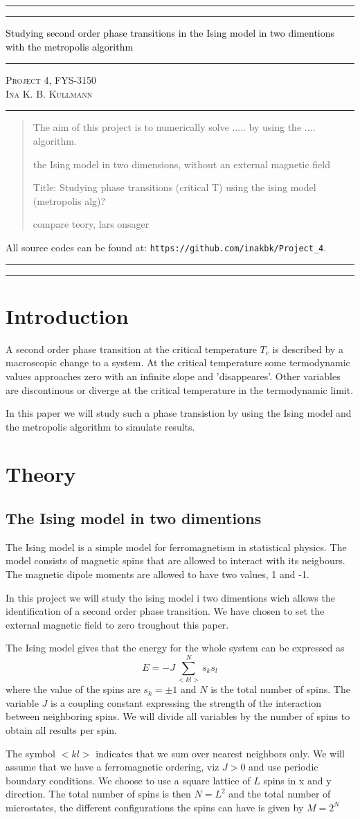 \documentclass[11pt,a4wide]{article}
\newcommand*{\titleAT}{\begingroup %
\newlength{\drop} %
\drop=0.1\textheight %

\rule{\textwidth}{1pt}\par %
\vspace{2pt}\vspace{-\baselineskip} %
\rule{\textwidth}{0.4pt}\par %

\vspace{0.5\drop} %
\centering %
\textcolor{black}{ %
{\Huge Studying second order phase transitions in the Ising model in two dimentions with the metropolis algorithm}\\[0.75\baselineskip] %
} 

\vspace{0.25\drop} %
\rule{0.3\textwidth}{0.4pt}\par %
\vspace{0.25\drop} %

{\Large \textsc{Project 4, FYS-3150\\[0.75\baselineskip] \normalsize{Ina K. B. Kullmann}
}}\par %


\vspace{0.25\drop} %
\rule{0.3\textwidth}{0.4pt}\par %
\vspace{0.25\drop} %

\begin{abstract}
The aim of this project is to numerically solve ..... by using the .... algorithm. 


the Ising model in two dimensions, without an external magnetic 
field

Title: Studying phase transitions (critical T) using the ising model (metropolis alg)?

compare teory, lars onsager





\end{abstract}
\vspace*{0.25\drop} %

\begin{center}
{ \scriptsize \noindent All source codes can be found at: \texttt{https://github.com/inakbk/Project\_4}. }
\end{center}

\rule{\textwidth}{0.4pt}\par %
\vspace{2pt}\vspace{-\baselineskip} %
\rule{\textwidth}{1pt}\par %

\endgroup}
\begin{document}
\titleAT %


\newpage
\tableofcontents
\newpage

\section{Introduction}
A second order phase transition at the critical temperature $T_c$ is described by a macroscopic change to a system. At the critical temperature some termodynamic values approaches zero with an infinite slope and 'disappeares'. Other variables are discontinous or diverge at the critical temperature in the termodynamic limit. 

In this paper we will study such a phase transistion by using the Ising model and the metropolis algorithm to simulate results. 

\section{Theory}

\subsection{The Ising model in two dimentions}
The Ising model is a simple model for ferromagnetism in statistical physics. The model consists of magnetic spins that are allowed to interact with its neigbours. The magnetic dipole moments are allowed to have two values, 1 and -1.

In this project we will study the ising model i two dimentions wich allows the identification of a second order phase transition. We have chosen to set the external magnetic field to zero troughout this paper.

The Ising model gives that the energy for the whole system can be expressed as
\begin{equation}
  E=-J\sum_{<kl>}^{N}s_ks_l
\end{equation}
where the value of the spins are  $s_k=\pm 1$ and $N$ is the total number of spins. The variable $J$ is a coupling constant expressing the strength of the interaction between neighboring spins. We will divide all variables by the number of spins to obtain all results per spin. 

The symbol $<kl>$ indicates that we sum over nearest neighbors only. We will assume that we have a ferromagnetic ordering, viz $J> 0$ and use periodic boundary conditions. We choose to use a square lattice of $L$ spins in x and y direction. The total number of spins is then $N = L^2$ and the total number of microstates, the different configurations the spins can have is given by $M=2^N$
\end{document}
